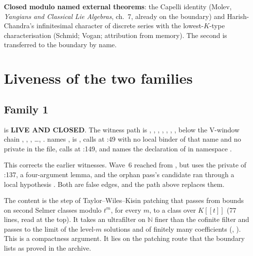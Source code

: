 \documentclass[11pt]{article}
\newcommand{\sE}{\textbf{Closed modulo named external theorems}}
\theoremstyle{remark}
\begin{document}
\sE: the Capelli identity (Molev, \emph{Yangians and Classical Lie Algebras}, ch.~7, already on the boundary) and Harish-Chandra's infinitesimal character of discrete series with the lowest-$K$-type characterisation (Schmid; Vogan; attribution from memory). The second is transferred to the boundary by name.

\section{Liveness of the two families}\label{sec:live}

\subsection{Family 1}

 is \textbf{LIVE AND CLOSED}. The witness path is
, , , , , , , below the V-window chain , , , \ldots, .  names ,  is ,  calls  at :49 with no local binder of that name and no private  in the file,  calls  at :149, and  names the declaration of  in namespace .

This corrects the earlier witnesses. Wave~6 reached  from , but  uses the private  of :137, a four-argument lemma, and the orphan pass's candidate ran through a local hypothesis . Both are false edges, and the path above replaces them.

The content is the step of Taylor--Wiles--Kisin patching that passes from bounds on second Selmer classes modulo $t^m$, for every $m$, to a class over $K[[t]]$ (77 lines, read at the top). It takes an ultrafilter on $\mathbb N$ finer than the cofinite filter and passes to the limit of the level-$m$ solutions and of finitely many coefficients (, ). This is a compactness argument. It lies on the patching route that the boundary lists as proved in the archive.
\end{document}
